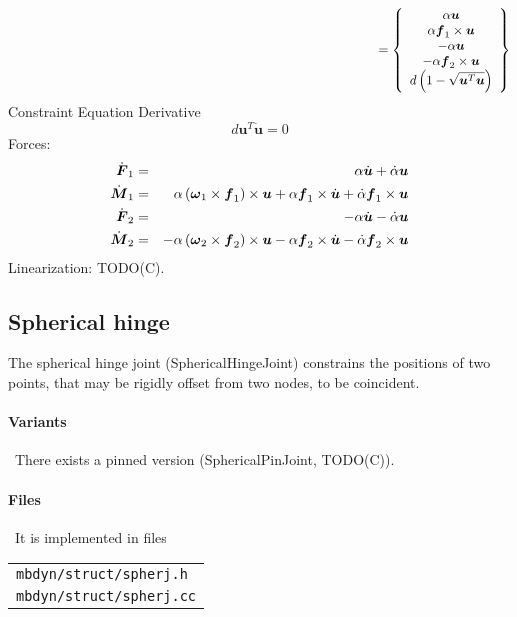 \documentclass[10pt,dvips,fleqn]{report}
\newcommand{\T}[1]{\boldsymbol{#1}}
\begin{document}
\begin{equation}
	\mbox{\hspace{100mm}} = \cubr{\cvvect{
		\alpha \T{u} \\
		\alpha \T{f}_1\times\T{u} \\
		-\alpha \T{u} \\
		-\alpha \T{f}_2\times\T{u} \\
		d\plbr{1 - \sqrt{\T{u}^T \T{u}}}
	}}
\end{equation}
Constraint Equation Derivative
\begin{equation}
	d \T{u}^T\dot{\T{u}} = 0
\end{equation}
Forces:
\begin{eqnarray}
	\dot{\T{F}}_1 & = &  \alpha \dot{\T{u}} + \dot{\alpha} \T{u} \\
	\dot{\T{M}}_1 & = & \alpha \plbr{\T{\omega}_1\times\T{f}_1} \times \T{u} 
		+ \alpha \T{f}_1 \times \dot{\T{u}}
		+ \dot{\alpha} \T{f}_1 \times \T{u} \\
	\dot{\T{F}}_2 & = & -\alpha \dot{\T{u}} - \dot{\alpha} \T{u} \\
	\dot{\T{M}}_2 & = & -\alpha \plbr{\T{\omega}_2 \times\T{f}_2} \times \T{u}
		- \alpha \T{f}_2 \times \dot{\T{u}}
		- \dot{\alpha} \T{f}_2 \times \T{u}
\end{eqnarray}
Linearization: TODO(C).





\subsection{Spherical hinge}
The spherical hinge joint (SphericalHingeJoint) constrains the positions
of two points, that may be rigidly offset from two nodes, to be coincident.

\paragraph{Variants} \
There exists a pinned version (SphericalPinJoint, TODO(C)).

\paragraph{Files} \
It is implemented in files

\begin{tabular}{l}
\texttt{mbdyn/struct/spherj.h} \\
\texttt{mbdyn/struct/spherj.cc}
\end{tabular}
\end{document}
